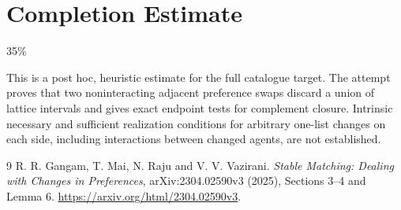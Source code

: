 \documentclass[11pt]{article}
\theoremstyle{definition}
\begin{document}
\section{Completion Estimate}
35\%

This is a post hoc, heuristic estimate for the full catalogue target.
The attempt proves that two noninteracting adjacent preference swaps discard a union of lattice intervals and gives exact endpoint tests for complement closure. Intrinsic necessary and sufficient realization conditions for arbitrary one-list changes on each side, including interactions between changed agents, are not established.

\begin{thebibliography}{9}
 R. R. Gangam, T. Mai, N. Raju and V. V. Vazirani.
\emph{Stable Matching: Dealing with Changes in Preferences},
arXiv:2304.02590v3 (2025), Sections 3--4 and Lemma 6.
\url{https://arxiv.org/html/2304.02590v3}.
\end{thebibliography}
\end{document}
